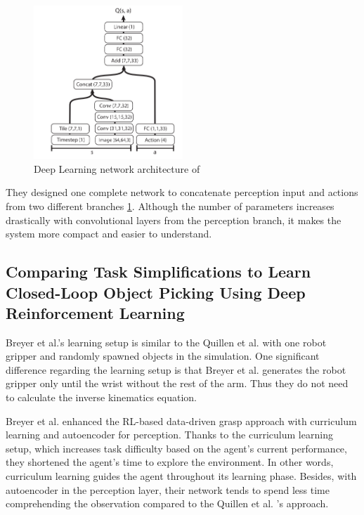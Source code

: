 \begin{figure}[htbp]
    \centering
    \includegraphics[width=0.5\textwidth]{figures/dql}
    \caption{Deep Learning network architecture of \cite{Quillen2018}}
    \label{fig:dql}
\end{figure}

They designed one complete network to concatenate perception input and actions from two different branches \ref{fig:dql}. Although the number of parameters increases drastically with convolutional layers from the perception branch, it makes the system more compact and easier to understand.

\subsection{Comparing Task Simplifications to Learn Closed-Loop Object Picking Using Deep Reinforcement Learning}

Breyer et al.'s learning setup is similar to the Quillen et al. with one robot gripper and randomly spawned objects in the simulation. One significant difference regarding the learning setup is that Breyer et al. generates the robot gripper only until the wrist without the rest of the arm. Thus they do not need to calculate the inverse kinematics equation.

Breyer et al. enhanced the RL-based data-driven grasp approach with curriculum learning and autoencoder for perception. Thanks to the curriculum learning setup, which increases task difficulty based on the agent's current performance, they shortened the agent's time to explore the environment. In other words, curriculum learning guides the agent throughout its learning phase. Besides, with autoencoder in the perception layer, their network tends to spend less time comprehending the observation compared to the Quillen et al. 's approach. 

